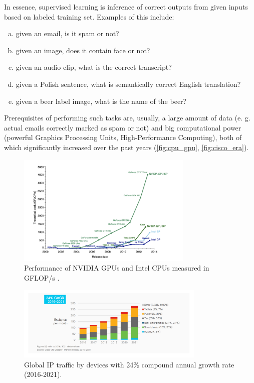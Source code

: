 \documentclass[11pt]{article}
\begin{document}
In essence, supervised learning is inference of correct outputs from given inputs based on labeled training set. Examples of this include:
\begin{enumerate}[a)]
\item given an email, is it spam or not?
\item given an image, does it contain face or not?
\item given an audio clip, what is the correct transcript?
\item given a Polish sentence, what is semantically correct English translation?
\item given a beer label image, what is the name of the beer?
\end{enumerate}
Prerequisites of performing such tasks are, usually, a large amount of data (e. g. actual emails correctly marked as spam or not) and big computational power (powerful Graphics Processing Units, High-Performance Computing), both of which significantly increased over the past years (\autoref{fig:cpu_gpu}, \autoref{fig:cisco_era}).\\

\begin{figure}[h]
\includegraphics[width=0.75\textwidth]{cpu_gpu}
\centering
\caption{Performance of NVIDIA GPUs and Intel CPUs measured in GFLOP/s \cite{cpu_vs_gpu}.}
\label{fig:cpu_gpu}
\end{figure}

\begin{figure}[h]
\includegraphics[width=0.8\textwidth]{cisco_era}
\centering
\caption{Global IP traffic by devices \cite{cisco_era} with 24\% compound annual growth rate (2016-2021).}
\label{fig:cisco_era}
\end{figure}
\end{document}
